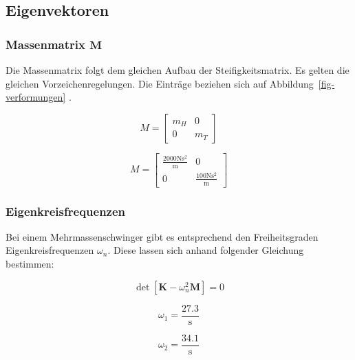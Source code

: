 \documentclass[
  letterpaper,
  DIV=11]{scrreprt}
\begin{document}
\hypertarget{eigenvektoren-2}{%
\subsection{Eigenvektoren}\label{eigenvektoren-2}}

\hypertarget{massenmatrix-mathbfm-2}{%
\subsubsection{\texorpdfstring{Massenmatrix
\(\mathbf{M}\)}{Massenmatrix \textbackslash mathbf\{M\}}}\label{massenmatrix-mathbfm-2}}

Die Massenmatrix folgt dem gleichen Aufbau der Steifigkeitsmatrix. Es
gelten die gleichen Vorzeichenregelungen. Die Einträge beziehen sich auf
Abbildung~\ref{fig-verformungen} .

\begin{equation*}M = \left[\begin{matrix}m_{H} & 0\\0 & m_{T}\end{matrix}\right]\end{equation*}

\begin{equation*}M = \left[\begin{matrix}\frac{2000 \text{N} \text{s}^{2}}{\text{m}} & 0\\0 & \frac{100 \text{N} \text{s}^{2}}{\text{m}}\end{matrix}\right]\end{equation*}

\hypertarget{eigenkreisfrequenzen-3}{%
\subsubsection{Eigenkreisfrequenzen}\label{eigenkreisfrequenzen-3}}

Bei einem Mehrmassenschwinger gibt es entsprechend den Freiheitsgraden
Eigenkreisfrequenzen \(\omega_n\). Diese lassen sich anhand folgender
Gleichung bestimmen:

\[\det{[\mathbf{K}-\omega_n^2 \mathbf{M}]=0}\]

\begin{equation*}\omega_{1} = \frac{27.3}{\text{s}}\end{equation*}

\begin{equation*}\omega_{2} = \frac{34.1}{\text{s}}\end{equation*}
\end{document}
